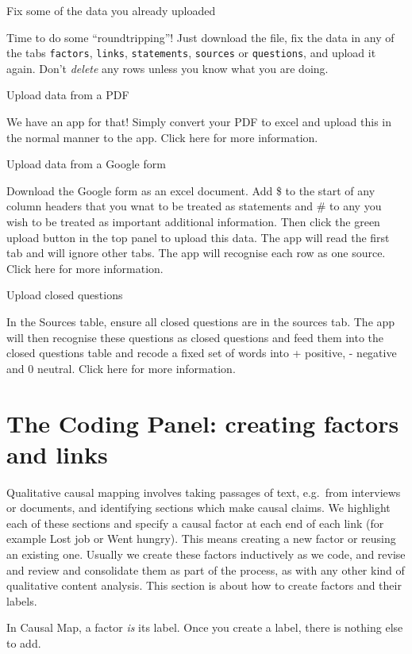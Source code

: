 \documentclass[
]{book}
\begin{document}
Fix some of the data you already uploaded

Time to do some ``roundtripping''! Just download the file, fix the data in any of the tabs \texttt{factors}, \texttt{links}, \texttt{statements}, \texttt{sources} or \texttt{questions}, and upload it again. Don't \emph{delete} any rows unless you know what you are doing.

Upload data from a PDF

We have an app for that! Simply convert your PDF to excel and upload this in the normal manner to the app. Click here for more information.

Upload data from a Google form

Download the Google form as an excel document. Add \$ to the start of any column headers that you wnat to be treated as statements and \# to any you wish to be treated as important additional information. Then click the green upload button in the top panel to upload this data. The app will read the first tab and will ignore other tabs. The app will recognise each row as one source. Click here for more information.

Upload closed questions

In the Sources table, ensure all closed questions are in the sources tab. The app will then recognise these questions as closed questions and feed them into the closed questions table and recode a fixed set of words into + positive, - negative and 0 neutral. Click here for more information.

\hypertarget{xcoding-panel}{%
\chapter{The Coding Panel: creating factors and links}\label{xcoding-panel}}

Qualitative causal mapping involves taking passages of text, e.g.~from interviews or documents, and identifying sections which make causal claims. We highlight each of these sections and specify a causal factor at each end of each link (for example Lost job or Went hungry). This means creating a new factor or reusing an existing one. Usually we create these factors inductively as we code, and revise and review and consolidate them as part of the process, as with any other kind of qualitative content analysis. This section is about how to create factors and their labels.

In Causal Map, a factor \emph{is} its label. Once you create a label, there is nothing else to add.
\end{document}
